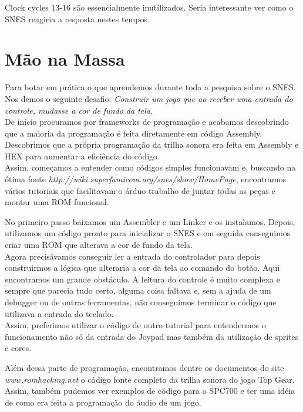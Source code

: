 \documentclass[paper=a4, fontsize=11pt]{scrartcl}	%
\numberwithin{equation}{section}															%
\numberwithin{figure}{section}																%
\numberwithin{table}{section}																%
\begin{document}
Clock cycles 13-16 são essencialmente inutilizados. Seria interessante ver como o SNES reagiria a resposta nestes tempos. 

\section{Mão na Massa}

Para botar em prática o que aprendemos durante toda a pesquisa sobre o SNES. Nos demos o seguinte desafio: \textit{Construir um jogo que ao receber uma entrada do controle, mudasse a cor de fundo da tela.}\\
De início procuramos por frameworks de programação e acabamos descobrindo que a maioria da programação é feita diretamente em código Assembly. Descobrimos que a própria programação da trilha sonora era feita em Assembly e HEX para aumentar a eficiência do código.\cite{DaveWiseInterview}\\

Assim, começamos a entender como códigos simples funcionavam e, buscando na ótima fonte \textit{http://wiki.superfamicom.org/snes/show/HomePage}, encontramos vários tutoriais que facilitavam o árduo trabalho de juntar todas as peças e montar uma ROM funcional.

No primeiro passo baixamos um Assembler e um Linker e os instalamos.\cite{Tut1} Depois, utilizamos um código pronto para inicializar o SNES\cite{Tut2} e em seguida conseguimos criar uma ROM que alterava a cor de fundo da tela.\cite{Tut3}\\

Agora precisávamos conseguir ler a entrada do controlador\cite{Tut4} para depois construirmos a lógica que alteraria a cor da tela ao comando do botão. Aqui encontramos um grande obstáculo. A leitura do controle é muito complexa e sempre que parecia tudo certo, alguma coisa faltava e, sem a ajuda de um debugger ou de outras ferramentas, não conseguimos terminar o código que utilizava a entrada do teclado.\\

Assim, preferimos utilizar o código de outro tutorial\cite{Tut5} para entendermos o funcionamento não só da entrada do Joypad mas também da utilização de sprites e cores.

Além dessa parte de programação, encontramos dentre os documentos do site\\ \textit{www.romhacking.net} o código fonte completo da trilha sonora do jogo Top Gear.\cite{TopGear} Assim, também pudemos ver exemplos de código para o SPC700 e ter uma idéia de como era feita a programação do áudio de um jogo.
\end{document}

